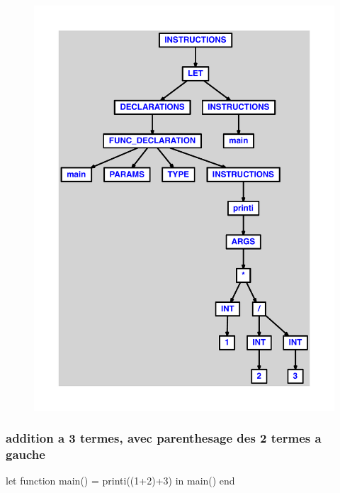 \documentclass{article}
\begin{document}
\begin{figure}[H]\centering\includegraphics[max width=\textwidth]{ast/ast_94.pdf}\end{figure}\subsubsection{addition a 3 termes, avec parenthesage des 2 termes a gauche}
\begin{verbatimtab}
let function main() = printi((1+2)+3) in main() end
\end{verbatimtab}
\end{document}
